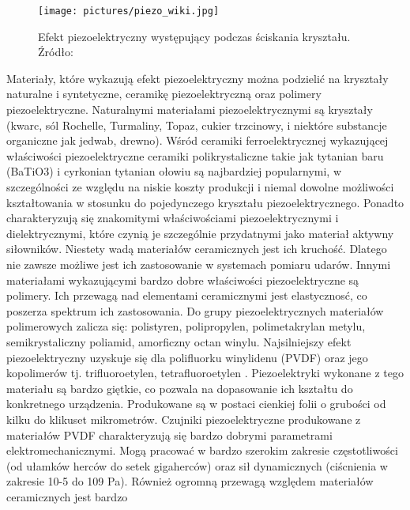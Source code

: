 \begin{figure}[htbp]
\centering
\texttt{[image: pictures/piezo\_wiki.jpg]}
\caption{Efekt piezoelektryczny występujący podczas ściskania kryształu. Źródło: \cite{piezo_wiki}}
\label{fig:piezo_effect}
\end{figure}
\pagebreak
Materiały, które wykazują efekt piezoelektryczny można podzielić na kryształy naturalne 
i syntetyczne, ceramikę piezoelektryczną oraz polimery piezoelektryczne. Naturalnymi 
materiałami piezoelektrycznymi są kryształy (kwarc, sól Rochelle, Turmaliny, Topaz, 
cukier trzcinowy, i niektóre substancje organiczne jak jedwab, drewno). Wśród ceramiki 
ferroelektrycznej wykazującej właściwości piezoelektryczne ceramiki polikrystaliczne 
takie jak tytanian baru (BaTiO3) i cyrkonian tytanian ołowiu są najbardziej popularnymi, 
w szczególności ze względu na niskie koszty produkcji i niemal dowolne możliwości 
kształtowania w stosunku do pojedynczego kryształu piezoelektrycznego. Ponadto 
charakteryzują się znakomitymi właściwościami piezoelektrycznymi i dielektrycznymi, 
które czynią je szczególnie przydatnymi jako materiał aktywny siłowników. Niestety wadą 
materiałów ceramicznych jest ich kruchość. Dlatego nie zawsze możliwe jest ich 
zastosowanie w systemach pomiaru udarów. Innymi materiałami wykazującymi bardzo dobre 
właściwości piezoelektryczne są polimery. Ich przewagą nad elementami ceramicznymi jest 
elastycznosć, co poszerza spektrum ich zastosowania. Do grupy piezoelektrycznych 
materiałów polimerowych zalicza się: polistyren, polipropylen, polimetakrylan metylu, 
semikrystaliczny poliamid, amorficzny octan winylu. Najsilniejszy efekt piezoelektryczny 
uzyskuje się dla polifluorku winylidenu (PVDF) oraz jego kopolimerów tj. trifluoroetylen,
tetrafluoroetylen \cite{prop}
. Piezoelektryki wykonane z tego materiału są bardzo giętkie, co 
pozwala na dopasowanie ich kształtu do konkretnego urządzenia. Produkowane są w postaci 
cienkiej folii o grubości od kilku do klikuset mikrometrów. Czujniki piezoelektryczne 
produkowane z materiałów PVDF charakteryzują się bardzo dobrymi parametrami 
elektromechanicznymi. Mogą pracować w bardzo szerokim zakresie częstotliwości 
(od ułamków herców do setek gigaherców) oraz sił dynamicznych (ciścnienia w zakresie 
10-5 do 109 Pa). Również ogromną przewagą względem materiałów ceramicznych jest bardzo 
